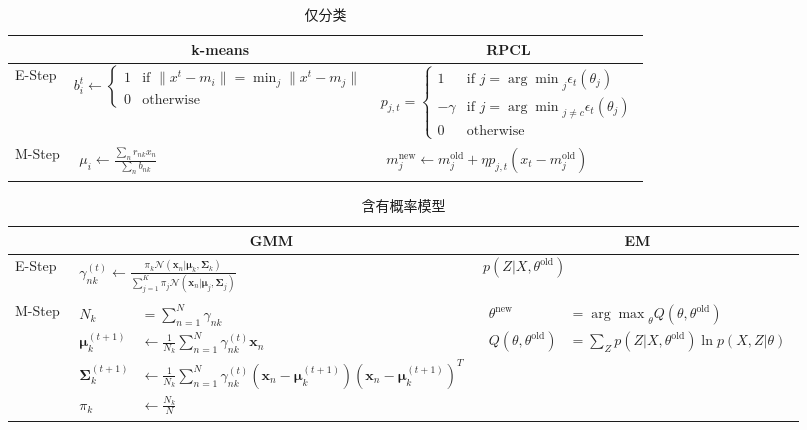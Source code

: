 \begin{table}
	\caption{仅分类}
	\begin{tabular}{l*{2}{l}}
		\toprule
		 & \multicolumn{1}{c}{k-means}  & \multicolumn{1}{c}{RPCL} \\		
		\midrule
		E-Step & $
			b_i^t\leftarrow\begin{cases}
			1 & \text{if } \lVert x^t-m_i\rVert=\min_j\lVert x^t-m_j\rVert \\
			0 & \text{otherwise}
		\end{cases}
		$ & $
		p_{j,t} = \begin{cases}
		    1 & \text{if } j={\arg\min}_j \epsilon_t(\theta_j)\\
		    -\gamma & \text{if } j={\arg\min}_{j\neq c}\epsilon_t(\theta_j)\\
		    0 & \text{otherwise}
		\end{cases}
		$  \\
		M-Step & $\begin{aligned}
			\mu_i\leftarrow \frac{\sum_n r_{nk}x_n}{\sum_n b_{nk}}
		\end{aligned}$ & $\begin{aligned}m_j^\text{new}\leftarrow m_j^\text{old}+\eta p_{j,t}(x_t-m_j^\text{old})\end{aligned}$ \\
		\bottomrule
	\end{tabular}
\end{table}

\begin{table}
	\caption{含有概率模型}
	\begin{tabular}{lll}
		\toprule
		 & \multicolumn{1}{c}{GMM} & \multicolumn{1}{c}{EM} \\
		\midrule
		E-Step & $\begin{aligned}\gamma_{nk}^{(t)}\leftarrow \frac{\pi_k\mathcal{N}(\bm{x}_n|\bm{\mu}_k,\bm{\Sigma}_k)}{\sum_{j=1}^K\pi_j\mathcal{N}(\bm{x}_n|\bm{\mu}_j,\bm{\Sigma}_j)}\end{aligned}$ & $p(Z|X,\theta^\text{old})$ \\
		M-Step & $\begin{aligned}
		N_k&=\sum_{n=1}^N\gamma_{nk}\\
		\bm{\mu}_k^{(t+1)}&\leftarrow\frac{1}{N_k}\sum_{n=1}^N\gamma_{nk}^{(t)}\bm{x}_n\\
		\bm{\Sigma}_k^{(t+1)}&\leftarrow\frac{1}{N_k}\sum_{n=1}^N\gamma_{nk}^{(t)}(\bm{x}_n-\bm{\mu}_k^{(t+1)})(\bm{x}_n-\bm{\mu}_k^{(t+1)})^T\\
		\pi_k&\leftarrow\frac{N_k}{N}
		\end{aligned}$ & $\begin{aligned}\theta^\text{new}&={\arg\max}_\theta Q(\theta,\theta^\text{old}) \\
		Q(\theta,\theta^\text{old})&=\sum_Z p(Z|X,\theta^\text{old})\ln p(X,Z|\theta)
		\end{aligned}$ \\ 
		\bottomrule
	\end{tabular}
\end{table}

